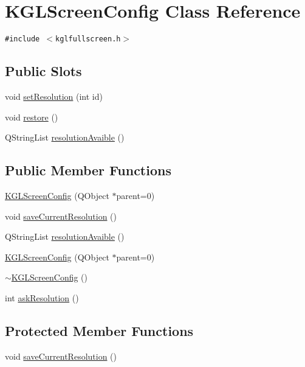 \hypertarget{class_k_g_l_screen_config}{
\section{KGLScreenConfig Class Reference}
\label{class_k_g_l_screen_config}
}
{\tt \#include $<$kglfullscreen.h$>$}

\subsection*{Public Slots}
\begin{CompactItemize}
\item 
void \hyperlink{class_k_g_l_screen_config_a7ff79a18684faf32a608ac6d3765dd5}{setResolution} (int id)
\item 
void \hyperlink{class_k_g_l_screen_config_776ed90926245757a108caf28a6eb1ba}{restore} ()
\item 
QStringList \hyperlink{class_k_g_l_screen_config_06830e5187b293902e25be12744945a0}{resolutionAvaible} ()
\end{CompactItemize}
\subsection*{Public Member Functions}
\begin{CompactItemize}
\item 
\hyperlink{class_k_g_l_screen_config_07864ac585640b6dc1857ad357d1b252}{KGLScreenConfig} (QObject $\ast$parent=0)
\item 
void \hyperlink{class_k_g_l_screen_config_ad681fe82fe2472913d9cfa0f5da5609}{saveCurrentResolution} ()
\item 
QStringList \hyperlink{class_k_g_l_screen_config_06830e5187b293902e25be12744945a0}{resolutionAvaible} ()
\item 
\hyperlink{class_k_g_l_screen_config_07864ac585640b6dc1857ad357d1b252}{KGLScreenConfig} (QObject $\ast$parent=0)
\item 
\hyperlink{class_k_g_l_screen_config_028b8c6174731641ed8443c6e02ab232}{$\sim$KGLScreenConfig} ()
\item 
int \hyperlink{class_k_g_l_screen_config_289cc45b508464a2ec12d47dbbc3f1f3}{askResolution} ()
\end{CompactItemize}
\subsection*{Protected Member Functions}
\begin{CompactItemize}
\item 
void \hyperlink{class_k_g_l_screen_config_ad681fe82fe2472913d9cfa0f5da5609}{saveCurrentResolution} ()
\end{CompactItemize}


